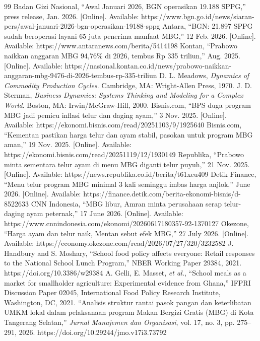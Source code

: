 \documentclass[10pt,twocolumn,a4paper]{article}
\begin{document}
\begin{thebibliography}{99}
\small
{} Badan Gizi Nasional, ``Awal Januari 2026, BGN operasikan 19.188 SPPG,'' press release, Jan. 2026. [Online]. Available: https://www.bgn.go.id/news/siaran-pers/awal-januari-2026-bgn-operasikan-19188-sppg
 Antara, ``BGN: 21.897 SPPG sudah beroperasi layani 65 juta penerima manfaat MBG,'' 12 Feb. 2026. [Online]. Available: https://www.antaranews.com/berita/5414198
 Kontan, ``Prabowo naikkan anggaran MBG 94,76\% di 2026, tembus Rp 335 triliun,'' Aug. 2025. [Online]. Available: https://nasional.kontan.co.id/news/prabowo-naikkan-anggaran-mbg-9476-di-2026-tembus-rp-335-triliun
 D. L. Meadows, \textit{Dynamics of Commodity Production Cycles}. Cambridge, MA: Wright-Allen Press, 1970.
 J. D. Sterman, \textit{Business Dynamics: Systems Thinking and Modeling for a Complex World}. Boston, MA: Irwin/McGraw-Hill, 2000.
 Bisnis.com, ``BPS duga program MBG jadi pemicu inflasi telur dan daging ayam,'' 3 Nov. 2025. [Online]. Available: https://ekonomi.bisnis.com/read/20251103/9/1925640
 Bisnis.com, ``Kementan pastikan harga telur dan ayam stabil, pasokan untuk program MBG aman,'' 19 Nov. 2025. [Online]. Available: https://ekonomi.bisnis.com/read/20251119/12/1930149
 Republika, ``Prabowo minta sementara telur ayam di menu MBG diganti telur puyuh,'' 21 Nov. 2025. [Online]. Available: https://news.republika.co.id/berita/t61xeu409
 Detik Finance, ``Menu telur program MBG minimal 3 kali seminggu imbas harga anjlok,'' June 2026. [Online]. Available: https://finance.detik.com/berita-ekonomi-bisnis/d-8522633
 CNN Indonesia, ``MBG libur, Amran minta perusahaan serap telur-daging ayam peternak,'' 17 June 2026. [Online]. Available: https://www.cnnindonesia.com/ekonomi/20260617180357-92-1370127
 Okezone, ``Harga ayam dan telur naik, Mentan sebut efek MBG,'' 27 July 2026. [Online]. Available: https://economy.okezone.com/read/2026/07/27/320/3232582
 J. Handbury and S. Moshary, ``School food policy affects everyone: Retail responses to the National School Lunch Program,'' NBER Working Paper 29384, 2021. https://doi.org/10.3386/w29384
 A. Gelli, E. Masset, \textit{et al.}, ``School meals as a market for smallholder agriculture: Experimental evidence from Ghana,'' IFPRI Discussion Paper 02045, International Food Policy Research Institute, Washington, DC, 2021.
 ``Analisis struktur rantai pasok pangan dan keterlibatan UMKM lokal dalam pelaksanaan program Makan Bergizi Gratis (MBG) di Kota Tangerang Selatan,'' \textit{Jurnal Manajemen dan Organisasi}, vol. 17, no. 3, pp. 275--291, 2026. https://doi.org/10.29244/jmo.v17i3.73792

\end{thebibliography}
\end{document}

